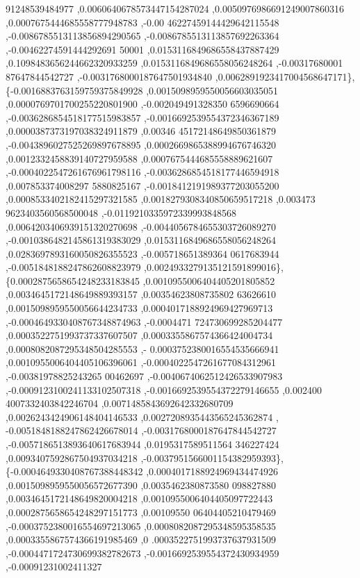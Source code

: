 \begin{DoxyCode}
      91248539484977 ,0.0060640678573447154287024 ,0.0050976986691249007860316 ,0.0007675444685558777948783 ,-0.00
      46227459144429642115548 ,-0.0086785513113856894290565 ,-0.0086785513113857692263364 ,-0.00462274591444292691
      50001 ,0.0153116849686558437887429 ,0.1098483656244662320933259 ,0.0153116849686558056248264 ,-0.00317680001
      87647844542727 ,-0.0031768000187647501934840 ,0.0062891923417004568647171\},
\{-0.0016883763159759375849928 ,0.0015098959550056603035051 ,0.0000769701700255220801900 ,-0.002049491328350
      6596690664 ,-0.0036286854518177515983857 ,-0.0016692539554372346367189 ,0.0000387373197038324911879 ,0.00346
      45172148649850361879 ,-0.0043896027525269897678895 ,0.0002669865388994676746320 ,0.0012332458839140727959588
       ,0.0007675444685558889621607 ,-0.0004022547261676961798116 ,-0.0036286854518177446594918 ,0.007853374008297
      5880825167 ,-0.0018412191989377203055200 ,0.0008533402182415297321585 ,0.0018279308340850659517218 ,0.003473
      9623403560568500048 ,-0.0119210335972339993848568 ,0.0064203406939151320270698 ,-0.0044056784655303726089270
       ,-0.0010386482145861319383029 ,0.0153116849686558056248264 ,0.0283697893160050826355523 ,-0.005718651389364
      0617683944 ,-0.0051848188247862608823979 ,0.0024933279135121591899016\},
\{0.0002875658654248233183845 ,0.0010955006404405201805852 ,0.0034645172148649889393157 ,0.00354623808735802
      63626610 ,0.0015098959550056644234733 ,0.0004017188924969427969713 ,-0.0004649330408767348874963 ,-0.0004471
      724730699285204477 ,0.0003522751993737337607507 ,0.0003355867574366424004734 ,0.0008082087295348504285553 ,-
      0.0003752380016554535666941 ,0.0010955006404405106396061 ,-0.0004022547261677084312961 ,-0.00381978825243265
      00462697 ,-0.0040674062512426533907983 ,-0.0009123100241133102507318 ,-0.0016692539554372279146655 ,0.002400
      4007332403842246704 ,0.0071485843692642332680709 ,0.0026243424906148404146533 ,0.0027208935443565245362874 ,
      -0.0051848188247862426678014 ,-0.0031768000187647844542727 ,-0.0057186513893640617683944 ,0.0195317589511564
      346227424 ,0.0093407592867504937034218 ,-0.0037951566001154382959393\},
\{-0.0004649330408767388448342 ,0.0004017188924969434474926 ,0.0015098959550056572677390 ,0.0035462380873580
      098827880 ,0.0034645172148649820004218 ,0.0010955006404405097722443 ,0.0002875658654248297151773 ,0.00109550
      06404405210479469 ,-0.0003752380016554697213065 ,0.0008082087295348595358535 ,0.0003355867574366191985469 ,0
      .0003522751993737637931509 ,-0.0004471724730699382782673 ,-0.0016692539554372430934959 ,-0.00091231002411327

\end{DoxyCode}
